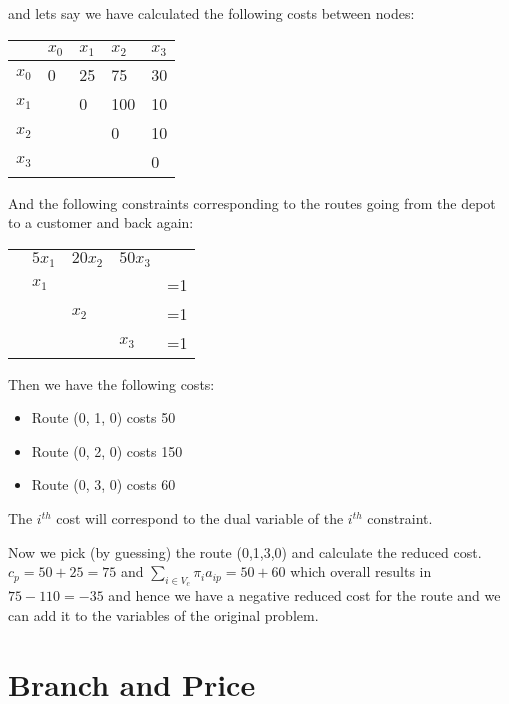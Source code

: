 \noindent and lets say we have calculated the following costs between nodes:

\begin{tabular}{|l|llll|}
\hline
        & $ x_0 $   & $ x_1 $ & $ x_2 $ & $ x_3 $ \\\hline
$ x_0 $ & 0         & 25      & 75      & 30  \\
$ x_1 $ &           & 0       & 100     & 10  \\
$ x_2 $ &           &         & 0       & 10  \\
$ x_3 $ &           &         &         & 0  \\
\hline
\end{tabular}

\noindent And the following constraints corresponding to the routes going from the depot to a customer and back again:

\begin{tabular}{lllll}
 & $5x_1$ & $20x_2$ & $50x_3$ &    \\
 & $x_1$  &         &         & =1 \\
 &        & $x_2$   &         & =1 \\
 &        &         & $x_3$   & =1
\end{tabular}

Then we have the following costs:
\begin{itemize}
\item[] Route (0, 1, 0) costs 50
\item[] Route (0, 2, 0) costs 150
\item[] Route (0, 3, 0) costs 60
\end{itemize}
The $i^{th}$ cost will correspond to the dual variable of the $i^{th}$ constraint.

Now we pick (by guessing) the route (0,1,3,0) and calculate the reduced cost. $c_p = 50+25=75$ and $\sum_{i\in V_c} \pi_i a_{ip} = 50+60 $ which overall results in $75-110 = -35$ and hence we have a negative reduced cost for the route and we can add it to the variables of the original problem.

\section{Branch and Price}



